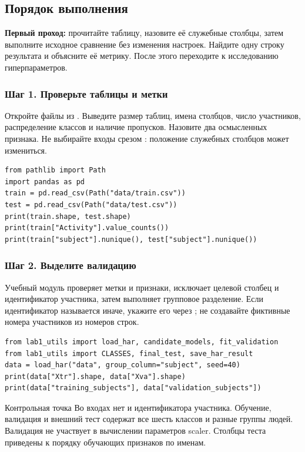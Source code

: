 \subsection{Порядок выполнения}
\textbf{Первый проход:} прочитайте таблицу, назовите её служебные столбцы, затем выполните исходное сравнение без изменения настроек. Найдите одну строку результата и объясните её метрику. После этого переходите к исследованию гиперпараметров.

\subsubsection*{Шаг 1. Проверьте таблицы и метки}
Откройте файлы из . Выведите размер таблиц, имена столбцов, число участников, распределение классов и наличие пропусков. Назовите два осмысленных признака. Не выбирайте входы срезом : положение служебных столбцов может измениться.
\begin{lstlisting}
from pathlib import Path
import pandas as pd
train = pd.read_csv(Path("data/train.csv"))
test = pd.read_csv(Path("data/test.csv"))
print(train.shape, test.shape)
print(train["Activity"].value_counts())
print(train["subject"].nunique(), test["subject"].nunique())
\end{lstlisting}

\subsubsection*{Шаг 2. Выделите валидацию}
Учебный модуль проверяет метки и признаки, исключает целевой столбец и идентификатор участника, затем выполняет групповое разделение. Если идентификатор называется иначе, укажите его через ; не создавайте фиктивные номера участников из номеров строк.
\begin{lstlisting}
from lab1_utils import load_har, candidate_models, fit_validation
from lab1_utils import CLASSES, final_test, save_har_result
data = load_har("data", group_column="subject", seed=40)
print(data["Xtr"].shape, data["Xva"].shape)
print(data["training_subjects"], data["validation_subjects"])
\end{lstlisting}

\begin{keybox}{Контрольная точка}
Во входах нет  и идентификатора участника. Обучение, валидация и внешний тест содержат все шесть классов и разные группы людей. Валидация не участвует в вычислении параметров scaler. Столбцы теста приведены к порядку обучающих признаков по именам.
\end{keybox}

